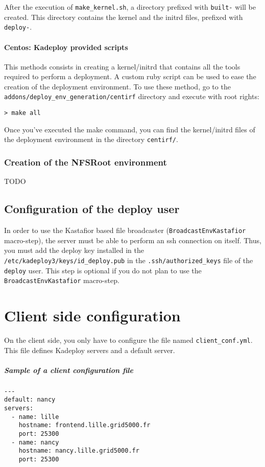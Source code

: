 \documentclass[a4wide,10pt,oneside]{book}
\begin{document}
After the execution of \texttt{make\_kernel.sh}, a directory prefixed with \texttt{built-} will be created. This directory contains the kernel and the initrd files, prefixed with \texttt{deploy-}.

\subsubsection{Centos: Kadeploy provided scripts}
This methods consists in creating a kernel/initrd that contains all the tools required to perform a deployment. A custom ruby script can be used to ease the creation of the deployment environment. To use these method, go to the \texttt{addons/deploy\_env\_generation/centirf} directory and execute with root rights:
\begin{small}
\begin{verbatim}
> make all
\end{verbatim}
\end{small}

Once you've executed the make command, you can find the kernel/initrd files of the deployment environment in the directory \texttt{centirf/}.

\subsection{Creation of the NFSRoot environment}
TODO

\section{Configuration of the deploy user}
In order to use the Kastafior based file broadcaster (\texttt{BroadcastEnvKastafior} macro-step), the server must be able to perform an ssh connection on itself. Thus, you must add the deploy key installed in the \texttt{/etc/kadeploy3/keys/id\_deploy.pub} in the \texttt{.ssh/authorized\_keys} file of the \texttt{deploy} user. This step is optional if you do not plan to use the \texttt{BroadcastEnvKastafior} macro-step.

\chapter{Client side configuration}
On the client side, you only have to configure the file named \texttt{client\_conf.yml}. This file defines Kadeploy servers and a default server.

\paragraph{Sample of a client configuration file}
\begin{verbatim}
---
default: nancy
servers:
  - name: lille
    hostname: frontend.lille.grid5000.fr
    port: 25300
  - name: nancy
    hostname: nancy.lille.grid5000.fr
    port: 25300
\end{verbatim}
\end{document}
